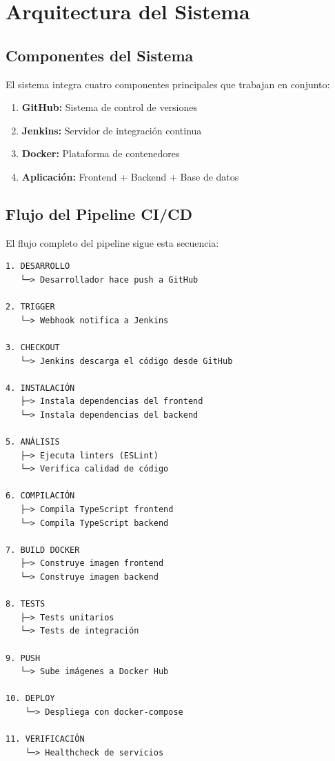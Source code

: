 \documentclass[12pt,a4paper]{article}
\begin{document}
\newpage

\section{Arquitectura del Sistema}

\subsection{Componentes del Sistema}

El sistema integra cuatro componentes principales que trabajan en conjunto:

\begin{enumerate}
    \item \textbf{GitHub:} Sistema de control de versiones
    \item \textbf{Jenkins:} Servidor de integración continua
    \item \textbf{Docker:} Plataforma de contenedores
    \item \textbf{Aplicación:} Frontend + Backend + Base de datos
\end{enumerate}

\subsection{Flujo del Pipeline CI/CD}

El flujo completo del pipeline sigue esta secuencia:

\begin{lstlisting}[caption=Flujo del Pipeline CI/CD]
1. DESARROLLO
   └─> Desarrollador hace push a GitHub
   
2. TRIGGER
   └─> Webhook notifica a Jenkins
   
3. CHECKOUT
   └─> Jenkins descarga el código desde GitHub
   
4. INSTALACIÓN
   ├─> Instala dependencias del frontend
   └─> Instala dependencias del backend
   
5. ANÁLISIS
   ├─> Ejecuta linters (ESLint)
   └─> Verifica calidad de código
   
6. COMPILACIÓN
   ├─> Compila TypeScript frontend
   └─> Compila TypeScript backend
   
7. BUILD DOCKER
   ├─> Construye imagen frontend
   └─> Construye imagen backend
   
8. TESTS
   ├─> Tests unitarios
   └─> Tests de integración
   
9. PUSH
   └─> Sube imágenes a Docker Hub
   
10. DEPLOY
    └─> Despliega con docker-compose
    
11. VERIFICACIÓN
    └─> Healthcheck de servicios
\end{lstlisting}
\end{document}

